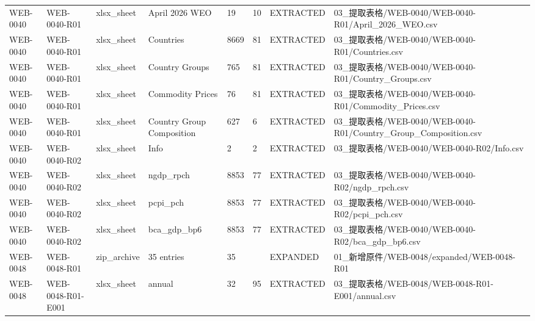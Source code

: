 \begin{landscape}
\begin{longtable}{p{1.8cm}p{2.2cm}p{3.1cm}p{4.7cm}p{1.3cm}p{1.3cm}p{3.0cm}p{5.3cm}}
WEB-0040 & WEB-0040-R01 & xlsx\_\allowbreak{}sheet & April 2026 WEO & 19 & 10 & EXTRACTED & 03\_\allowbreak{}提取表格/\allowbreak{}WEB-0040/\allowbreak{}WEB-0040-R01/\allowbreak{}April\_\allowbreak{}2026\_\allowbreak{}WEO.csv\\
WEB-0040 & WEB-0040-R01 & xlsx\_\allowbreak{}sheet & Countries & 8669 & 81 & EXTRACTED & 03\_\allowbreak{}提取表格/\allowbreak{}WEB-0040/\allowbreak{}WEB-0040-R01/\allowbreak{}Countries.csv\\
WEB-0040 & WEB-0040-R01 & xlsx\_\allowbreak{}sheet & Country Groups & 765 & 81 & EXTRACTED & 03\_\allowbreak{}提取表格/\allowbreak{}WEB-0040/\allowbreak{}WEB-0040-R01/\allowbreak{}Country\_\allowbreak{}Groups.csv\\
WEB-0040 & WEB-0040-R01 & xlsx\_\allowbreak{}sheet & Commodity Prices & 76 & 81 & EXTRACTED & 03\_\allowbreak{}提取表格/\allowbreak{}WEB-0040/\allowbreak{}WEB-0040-R01/\allowbreak{}Commodity\_\allowbreak{}Prices.csv\\
WEB-0040 & WEB-0040-R01 & xlsx\_\allowbreak{}sheet & Country Group Composition & 627 & 6 & EXTRACTED & 03\_\allowbreak{}提取表格/\allowbreak{}WEB-0040/\allowbreak{}WEB-0040-R01/\allowbreak{}Country\_\allowbreak{}Group\_\allowbreak{}Composition.csv\\
WEB-0040 & WEB-0040-R02 & xlsx\_\allowbreak{}sheet & Info & 2 & 2 & EXTRACTED & 03\_\allowbreak{}提取表格/\allowbreak{}WEB-0040/\allowbreak{}WEB-0040-R02/\allowbreak{}Info.csv\\
WEB-0040 & WEB-0040-R02 & xlsx\_\allowbreak{}sheet & ngdp\_\allowbreak{}rpch & 8853 & 77 & EXTRACTED & 03\_\allowbreak{}提取表格/\allowbreak{}WEB-0040/\allowbreak{}WEB-0040-R02/\allowbreak{}ngdp\_\allowbreak{}rpch.csv\\
WEB-0040 & WEB-0040-R02 & xlsx\_\allowbreak{}sheet & pcpi\_\allowbreak{}pch & 8853 & 77 & EXTRACTED & 03\_\allowbreak{}提取表格/\allowbreak{}WEB-0040/\allowbreak{}WEB-0040-R02/\allowbreak{}pcpi\_\allowbreak{}pch.csv\\
WEB-0040 & WEB-0040-R02 & xlsx\_\allowbreak{}sheet & bca\_\allowbreak{}gdp\_\allowbreak{}bp6 & 8853 & 77 & EXTRACTED & 03\_\allowbreak{}提取表格/\allowbreak{}WEB-0040/\allowbreak{}WEB-0040-R02/\allowbreak{}bca\_\allowbreak{}gdp\_\allowbreak{}bp6.csv\\
WEB-0048 & WEB-0048-R01 & zip\_\allowbreak{}archive & 35 entries & 35 &  & EXPANDED & 01\_\allowbreak{}新增原件/\allowbreak{}WEB-0048/\allowbreak{}expanded/\allowbreak{}WEB-0048-R01\\
WEB-0048 & WEB-0048-R01-E001 & xlsx\_\allowbreak{}sheet & annual & 32 & 95 & EXTRACTED & 03\_\allowbreak{}提取表格/\allowbreak{}WEB-0048/\allowbreak{}WEB-0048-R01-E001/\allowbreak{}annual.csv\\

\end{longtable}
\end{landscape}
